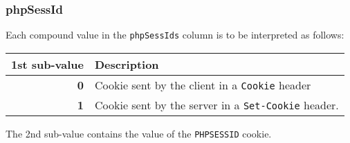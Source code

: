 \documentclass[documentation]{subfiles}
\begin{document}
\subsubsection{phpSessId}\label{phpSessId}
Each compound value in the {\tt phpSessIds} column is to be interpreted as follows:

\begin{longtable}{rl}
    {\bf 1st sub-value} & {\bf Description}\\
    \hline\endhead
    {\bf 0} & Cookie sent by the client in a {\tt Cookie} header\\
    {\bf 1} & Cookie sent by the server in a {\tt Set-Cookie} header.\\
\end{longtable}

The 2nd sub-value contains the value of the {\tt PHPSESSID} cookie.
\end{document}
